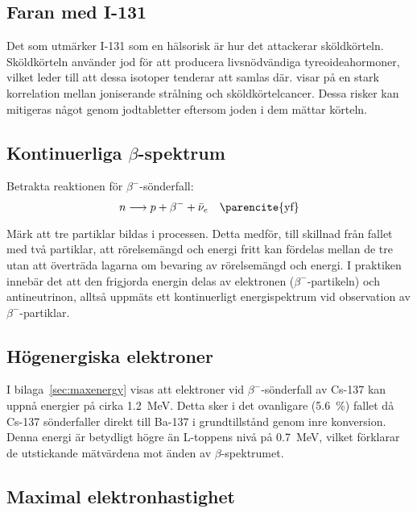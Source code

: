 \subsection{Faran med I-131}

Det som utmärker I-131 som en hälsorisk är hur det attackerar sköldkörteln.
Sköldkörteln använder jod för att producera livsnödvändiga tyreoideahormoner,
vilket leder till att dessa isotoper tenderar att samlas där. \textcite{iodine}
visar på en stark korrelation mellan joniserande strålning och
sköldkörtelcancer. Dessa risker kan mitigeras något genom jodtabletter eftersom
joden i dem mättar körteln.

\subsection{Kontinuerliga $\beta$-spektrum}

Betrakta reaktionen för $\beta^-$-sönderfall:
%
\begin{equation}
    n \longrightarrow p + \beta^- + \bar{\nu}_e \quad \text{\parencite{yf}}
\end{equation}

Märk att tre partiklar bildas i processen. Detta medför, till skillnad från
fallet med två partiklar, att rörelsemängd och energi fritt kan fördelas
mellan de tre utan att överträda lagarna om bevaring av rörelsemängd och
energi. I praktiken innebär det att den frigjorda energin delas av elektronen
($\beta^-$-partikeln) och antineutrinon, alltså uppmäts ett kontinuerligt
energispektrum vid observation av $\beta^-$-partiklar.

\subsection{Högenergiska elektroner}

I bilaga~\ref{sec:maxenergy} visas att elektroner vid $\beta^-$-sönderfall av
Cs-137 kan uppnå energier på cirka \qty{1.2}{\MeV}. Detta sker i det ovanligare
(\qty{5.6}{\percent}) fallet då Cs-137 sönderfaller direkt till Ba-137 i
grundtillstånd genom inre konversion. Denna energi är betydligt högre än
L-toppens nivå på \qty{0.7}{\MeV}, vilket förklarar de utstickande mätvärdena
mot änden av $\beta$-spektrumet.

\subsection{Maximal elektronhastighet}

